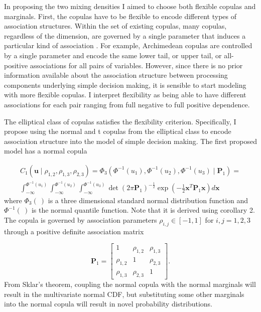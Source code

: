 \documentclass[12pt]{article}
\begin{document}
	In proposing the two mixing densities I aimed to choose both flexible copulas and marginals. First, the copulas have to be flexible to encode different types of association structures. Within the set of existing copulas, many copulas, regardless of the dimension, are governed by a single parameter that induces a particular kind of association \citep{Joe1997,Nel2007}. For example, Archimedean copulas are controlled by a single parameter and encode the same lower tail, or upper tail, or all-positive associations for all pairs of variables. However, since there is no prior information available about the association structure between processing components underlying simple decision making, it is sensible to start modeling with more flexible copulas. I interpret flexibility as being able to have different associations for each pair ranging from full negative to full positive dependence. 
    
	The elliptical class of copulas satisfies the flexibility criterion. Specifically, I propose using the normal and t copulas from the elliptical class to encode association structure into the model of simple decision making. The first proposed model has a normal copula 

\begin{eqnarray}
C_1 (\boldsymbol{u} \mid \rho_{1,2},\rho_{1,3},\rho_{2,3}) = \Phi_3(\Phi^{-1}(u_1),\Phi^{-1}(u_2),\Phi^{-1}(u_3) \mid \boldsymbol{P}_1) = \nonumber \\ \int_{-\infty}^{\Phi^{-1}(u_1)}\int_{-\infty}^{\Phi^{-1}(u_2)}\int_{-\infty}^{\Phi^{-1}(u_3)}\operatorname{det}(2\pi\boldsymbol{P}_1)^{-\frac{1}{2}}\operatorname{exp}(-\frac{1}{2}\boldsymbol{x}^T\boldsymbol{P}_1\boldsymbol{x})d\boldsymbol{x}
\end{eqnarray}
where $\Phi_3(\:)$ is a three dimensional standard normal distribution function and $\Phi^{-1}(\:)$ is the normal quantile function. Note that it is derived using corollary 2. The copula is governed by association parameters $\rho_{i,j} \in [-1, 1]$ for $i, j = 1, 2, 3$ through a positive definite association matrix

\begin{equation}
\boldsymbol{P}_1 = \left[ \begin{array}{ccc}
1 & \rho_{1, 2} & \rho_{1, 3} \\
\rho_{1, 2} & 1 & \rho_{2, 3} \\
\rho_{1, 3} & \rho_{2, 3} & 1
\end{array}
\right].
\end{equation}
From Sklar’s theorem, coupling the normal copula with the normal marginals will result in the multivariate normal CDF, but substituting some other marginals into the normal copula will result in novel probability distributions. 
\end{document}
